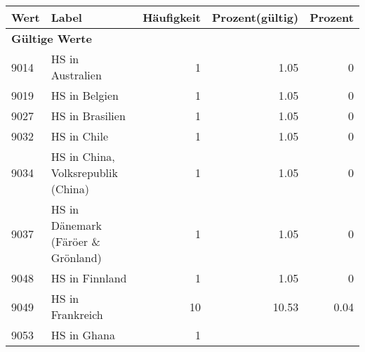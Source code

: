      \begin{longtable}{lXrrr}
     \toprule
     \textbf{Wert} & \textbf{Label} & \textbf{Häufigkeit} & \textbf{Prozent(gültig)} & \textbf{Prozent} \\
     \endhead
     \midrule
     \multicolumn{5}{l}{\textbf{Gültige Werte}}\\
        9014 & \multicolumn{1}{X}{HS in Australien} & %
          \num{1} &
          \num[round-mode=places,round-precision=2]{1,05} &
          \num[round-mode=places,round-precision=2]{0} \\
        9019 & \multicolumn{1}{X}{HS in Belgien} & %
          \num{1} &
          \num[round-mode=places,round-precision=2]{1,05} &
          \num[round-mode=places,round-precision=2]{0} \\
        9027 & \multicolumn{1}{X}{HS in Brasilien} & %
          \num{1} &
          \num[round-mode=places,round-precision=2]{1,05} &
          \num[round-mode=places,round-precision=2]{0} \\
        9032 & \multicolumn{1}{X}{HS in Chile} & %
          \num{1} &
          \num[round-mode=places,round-precision=2]{1,05} &
          \num[round-mode=places,round-precision=2]{0} \\
        9034 & \multicolumn{1}{X}{HS in China, Volksrepublik (China)} & %
          \num{1} &
          \num[round-mode=places,round-precision=2]{1,05} &
          \num[round-mode=places,round-precision=2]{0} \\
        9037 & \multicolumn{1}{X}{HS in Dänemark (Färöer \& Grönland)} & %
          \num{1} &
          \num[round-mode=places,round-precision=2]{1,05} &
          \num[round-mode=places,round-precision=2]{0} \\
        9048 & \multicolumn{1}{X}{HS in Finnland} & %
          \num{1} &
          \num[round-mode=places,round-precision=2]{1,05} &
          \num[round-mode=places,round-precision=2]{0} \\
        9049 & \multicolumn{1}{X}{HS in Frankreich} & %
          \num{10} &
          \num[round-mode=places,round-precision=2]{10,53} &
          \num[round-mode=places,round-precision=2]{0,04} \\
        9053 & \multicolumn{1}{X}{HS in Ghana} & %
          \num{1} &

\end{longtable}
